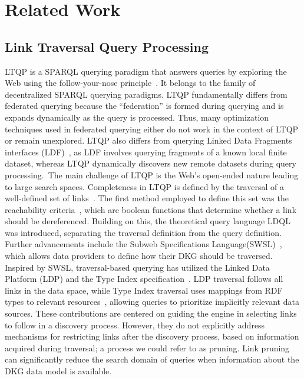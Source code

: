 \section{Related Work}\label{sec:related_work}

\subsection{Link Traversal Query Processing}
LTQP is a SPARQL querying paradigm that answers queries by exploring the Web using the follow-your-nose principle~\cite{hartig2016walking}.
It belongs to the family of decentralized SPARQL querying paradigms.
LTQP fundamentally differs from federated querying because the ``federation'' is formed during querying and is expands dynamically as the query is processed.
Thus, many optimization techniques used in federated querying either do not work in the context of LTQP or remain unexplored.
LTQP also differs from querying Linked Data Fragments interfaces (LDF)~\cite{azzam2020smart,azzam2021wisekg, DBLP:journals/corr/HartigA16}, as LDF involves querying fragments of a known local finite dataset, whereas LTQP dynamically discovers new remote datasets during query processing.\
The main challenge of LTQP is the Web's open-ended nature leading to large search spaces.
Completeness in LTQP is defined by the traversal of a well-defined set of links~\cite{Hartig2012}.
The first method employed to define this set was the reachability criteria~\cite{Hartig2012}, which are boolean functions that determine whether a link should be dereferenced.
Building on this, the theoretical query language LDQL~\cite{hartigLDQL} was introduced, separating the traversal definition from the query definition.
Further advancements include the Subweb Specifications Language(SWSL)~\cite{Bogaerts2021LinkTW}, which allows data providers to define how their DKG should be traversed.
Inspired by SWSL, traversal-based querying has utilized the Linked Data Platform (LDP) and the Type Index specification~\cite{Taelman2023}.  
LDP traversal follows all links in the data space, while Type Index traversal uses mappings from RDF types to relevant resources~\cite{solidTypeIndexes}, allowing queries to prioritize implicitly relevant data sources.
These contributions are centered on guiding the engine in selecting links to follow in a discovery process.
However, they do not explicitly address mechanisms for restricting links after the discovery process, based on information acquired during traversal; a process we could refer to as pruning.
Link pruning can significantly reduce the search domain of queries when information about the DKG data model is available.

